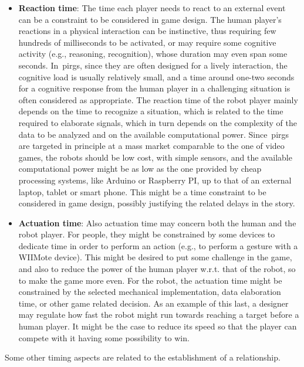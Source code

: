 \begin{itemize}
\item \textbf{Reaction time}: The time each player needs to react to an external event can be a constraint to be considered in game design. The human player's reactions in a physical interaction can be instinctive, thus requiring few hundreds of milliseconds to be activated, or may require some cognitive activity (e.g., reasoning, recognition), whose duration may even span some seconds. In~\gls{pirg}s, since they are often designed for a lively interaction, the cognitive load is usually relatively small, and a time around one-two seconds for a cognitive response from the human player in a challenging situation is often considered as appropriate. The reaction time of the robot player mainly depends on the time to recognize a situation, which is related to the time required to elaborate signals, which in turn depends on the complexity of the data to be analyzed and on the available computational power. Since~\gls{pirg}s are targeted in principle at a mass market comparable to the one of video games, the robots should be low cost, with simple sensors, and the available computational power might be as low as the one provided by cheap processing systems, like Arduino or Raspberry PI, up to that of an external laptop, tablet or smart phone. This might be a time constraint to be considered in game design, possibly justifying the related delays in the story.

\item \textbf{Actuation time}: Also actuation time may concern both the human and the robot player. For people, they might be constrained by some devices to dedicate time in order to perform an action (e.g., to perform a gesture with a WIIMote device). This might be desired to put some challenge in the game, and also to reduce the power of the human player w.r.t. that of the robot, so to make the game more even. For the robot, the actuation time might be constrained by the selected mechanical implementation, data elaboration time, or other game related decision. As an example of this last, a designer may regulate how fast the robot might run towards reaching a target before a human player. It might be the case to reduce its speed so that the player can compete with it having some possibility to win.
\end{itemize}

Some other timing aspects are related to the establishment of a relationship.

